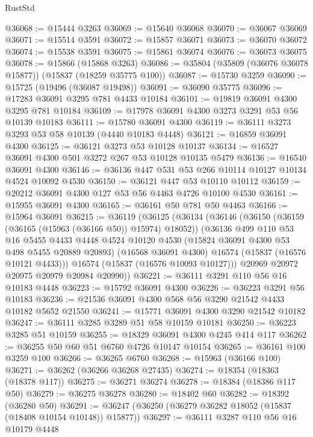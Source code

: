 \begin{lexlean}{RustStd}
\begin{coremodule}
@36068 := @15444 @3263
@36069 := @15640 @36068
@36070 := @36067 @36069
@36071 := @15514 @3591
@36072 := @15857 @36071
@36073 := @36070 @36072
@36074 := @15538 @3591
@36075 := @15861 @36074
@36076 := @36073 @36075
@36078 := @15866 (@15868 @3263)
@36086 := @35804 (@35809 (@36076 @36078 @15877)) (@15837 (@18259 @35775 @100))
@36087 := @15730 @3259
@36090 := @15725 (@19496 (@36087 @19498))
@36091 := @36090 @35775
@36096 := @17283 @36091 @3295 @781 @4433 @10184
@36101 := @19819 @36091 @4300 @3295 @781 @10184
@36109 := @17978 @36091 @4300 @3273 @3291 @53 @56 @10139 @10183
@36111 := @15780 @36091 @4300
@36119 := @36111 @3273 @3293 @53 @58 @10139 (@4440 @10183 @4448)
@36121 := @16859 @36091 @4300
@36125 := @36121 @3273 @53 @10128 @10137
@36134 := @16527 @36091 @4300 @501 @3272 @267 @53 @10128 @10135 @5479
@36136 := @16540 @36091 @4300
@36146 := @36136 @447 @531 @53 @266 @10114 @10127 @10134 @4524 @10092 @4530
@36150 := @36121 @447 @53 @10110 @10112
@36159 := @20212 @36091 @4300 @127 @53 @56 @4463 @4726 @10100 @4530
@36161 := @15955 @36091 @4300
@36165 := @36161 @50 @781 @50 @4463
@36166 := @15964 @36091
@36215 := @36119
    (@36125
      (@36134
        (@36146
          (@36150 (@36159 (@36165 (@15963 (@36166 @50)) @15974) @18052))
          (@36136
            @499
            @110
            @53
            @16
            @5455
            @4433
            @4448
            @4524
            @10120
            @4530
            (@15824 @36091 @4300 @53 @498 @5455 @20889 @20893)
            (@16568 @36091 @4300)
            @16574
            (@15837 (@16576 @10121 @4433)))
          @16574
          (@15837 (@16576 @10093 @10127)))
        @20969
        @20972
        @20975
        @20979
        @20984
        @20990))
@36221 := @36111 @3291 @110 @56 @16 @10183 @4448
@36223 := @15792 @36091 @4300
@36226 := @36223 @3291 @56 @10183
@36236 := @21536 @36091 @4300 @568 @56 @3290 @21542 @4433 @10182 @5652 @21550
@36241 := @15771 @36091 @4300 @3290 @21542 @10182
@36247 := @36111 @3285 @3289 @51 @58 @10159 @10181
@36250 := @36223 @3285 @51 @10159
@36255 := @18329 @36091 @4300 @4245 @414 @117
@36262 := @36255 @50 @60 @51 @6760 @4726 @10147 @10154
@36265 := @36161 @100 @3259 @100
@36266 := @36265 @6760
@36268 := @15963 (@36166 @100)
@36271 := @36262 (@36266 @36268 @27435)
@36274 := @18354 (@18363 (@18378 @117))
@36275 := @36271 @36274
@36278 := @18384 (@18386 @117 @50)
@36279 := @36275 @36278
@36280 := @18402 @60
@36282 := @18392 (@36280 @50)
@36291 := @36247 (@36250 (@36279 @36282 @18052 (@15837 (@18408 @10154 @10148)) @15877))
@36297 := @36111 @3287 @110 @56 @16 @10179 @4448

\end{coremodule}
\end{lexlean}
